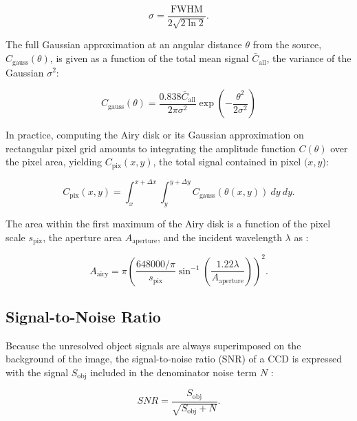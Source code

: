 \begin{equation} \label{eq:airy_variance}
  \sigma = \frac{\mathrm{FWHM}}{2 \sqrt{2 \ln{2}}}.
\end{equation}

The full Gaussian approximation at an angular distance $\theta$ from the source, $C_\mathrm{gauss}(\theta)$, is given as a function of the total mean signal $\bar{C}_\mathrm{all}$, the variance of the Gaussian $\sigma^2$:

\begin{equation} \label{eq:airy_gaussian}
  C_\mathrm{gauss}(\theta) = \frac{0.838 \bar{C}_\mathrm{all}}{2 \pi \sigma^2} \exp\left( - \frac{\theta^2}{2 \sigma^2} \right)
\end{equation}

In practice, computing the Airy disk or its Gaussian approximation on rectangular pixel grid amounts to integrating the amplitude function $C(\theta)$ over the pixel area, yielding $C_\mathrm{pix}(x, y)$, the total signal contained in pixel $(x,y$):

\begin{equation} \label{eq:pix_values_gauss}
  C_\mathrm{pix}(x, y) = \int_{x}^{x + \Delta x} \int_{y}^{y + \Delta y}{C_\mathrm{gauss}(\theta(x, y))} \: dy \: dy.
\end{equation}

The area within the first maximum of the Airy disk is a function of the pixel scale $s_\mathrm{pix}$, the aperture area $A_\mathrm{aperture}$, and the incident wavelength $\lambda$ as \cite{frueh2019notes}:

\begin{equation} \label{eq:airy_area}
  A_\mathrm{airy} = \pi \left(\frac{648000 / \pi}{s_\mathrm{pix}} \sin^{-1}\left(\frac{1.22 \lambda}{A_\mathrm{aperture}}\right) \right)^2.
\end{equation}

\subsection{Signal-to-Noise Ratio}

Because the unresolved object signals are always superimposed on the background of the image, the signal-to-noise ratio (SNR) of a CCD is expressed with the signal $S_\mathrm{obj}$ included in the denominator noise term $N$ \cite{frueh2019notes}:

\begin{equation} \label{eq:ccd_snr}
  SNR = \frac{S_\mathrm{obj}}{\sqrt{S_\mathrm{obj}+N}}.
\end{equation}

